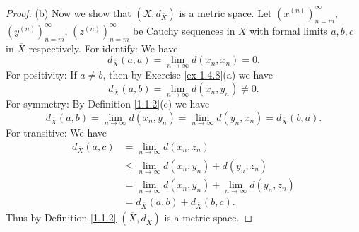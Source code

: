 \begin{proof}{(b)}
    Now we show that \((\overline{X}, d_{\overline{X}})\) is a metric space.
    Let \((x^{(n)})_{n = m}^\infty\), \((y^{(n)})_{n = m}^\infty\), \((z^{(n)})_{n = m}^\infty\) be Cauchy sequences in \(X\) with formal limits \(a, b, c\) in \(\overline{X}\) respectively.
    For identify:
    We have
    \[
        d_{\overline{X}}(a, a) = \lim_{n \to \infty} d(x_n, x_n) = 0.
    \]
    For positivity:
    If \(a \neq b\), then by Exercise \ref{ex 1.4.8}(a) we have
    \[
        d_{\overline{X}}(a, b) = \lim_{n \to \infty} d(x_n, y_n) \neq 0.
    \]
    For symmetry:
    By Definition \ref{1.1.2}(c) we have
    \[
        d_{\overline{X}}(a, b) = \lim_{n \to \infty} d(x_n, y_n) = \lim_{n \to \infty} d(y_n, x_n) = d_{\overline{X}}(b, a).
    \]
    For transitive:
    We have
    \begin{align*}
        d_{\overline{X}}(a, c) & = \lim_{n \to \infty} d(x_n, z_n)                                   \\
                               & \leq \lim_{n \to \infty} d(x_n, y_n) + d(y_n, z_n)                  \\
                               & = \lim_{n \to \infty} d(x_n, y_n) + \lim_{n \to \infty} d(y_n, z_n) \\
                               & = d_{\overline{X}}(a, b) + d_{\overline{X}}(b, c).
    \end{align*}
    Thus by Definition \ref{1.1.2} \((\overline{X}, d_{\overline{X}})\) is a metric space.
\end{proof}

